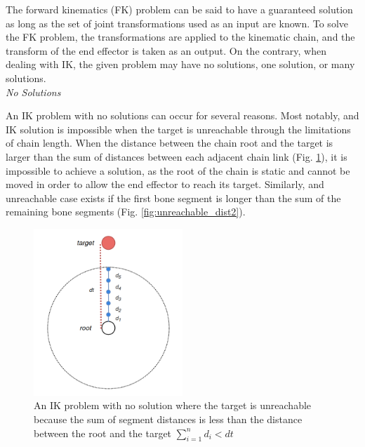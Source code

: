 The forward kinematics (FK) problem can be said to have a guaranteed solution as
long as the set of joint transformations used as an input are known. To solve
the FK problem, the transformations are applied to the kinematic chain, and the
transform of the end effector is taken as an output. On the contrary, when
dealing with IK, the given problem may have no solutions, one solution, or many
solutions. \\

\noindent\textit{No Solutions}

An IK problem with no solutions can occur for several reasons. Most notably, and
IK solution is impossible when the target is unreachable through the limitations
of chain length. When the distance between the chain root and the target is
larger than the sum of distances between each adjacent chain link (Fig.
\ref{fig:unreachable_dist1}), it is impossible to achieve a solution, as the
root of the chain is static and cannot be moved in order to allow the end
effector to reach its target. Similarly, and unreachable case exists if the
first bone segment is longer than the sum of the remaining bone segments (Fig.
\ref{fig:unreachable_dist2}).

\begin{figure}[!h]
    \centering
    \captionsetup{justification=centering}
    \includegraphics[width=0.5\textwidth]{grafika/unreachable_dist_1.png}
    \caption{An IK problem with no solution where the target is unreachable
    because the sum of segment distances is less than the distance between the
    root and the target \(\sum_{i=1}^{n}d_i < dt\) }
    \label{fig:unreachable_dist1}
\end{figure}

